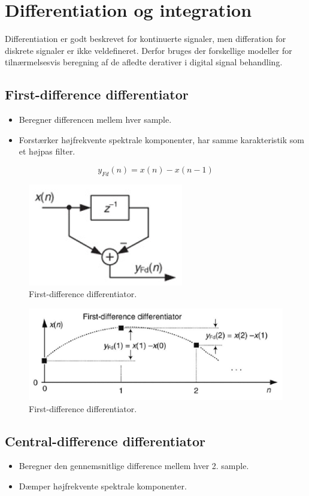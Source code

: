 \documentclass[danish]{article}
\begin{document}
\newpage
\section{Differentiation og integration}

Differentiation er godt beskrevet for kontinuerte signaler, men differation for diskrete signaler er ikke veldefineret. Derfor bruges der forskellige modeller for tilnærmelsesvis beregning af de afledte derativer i digital signal behandling.

\subsection{First-difference differentiator}
\begin{itemize}
	\item Beregner differencen mellem hver sample. 
	\item Forstærker højfrekvente spektrale komponenter, har samme karakteristik som et højpas filter.
\end{itemize}

\begin{equation}
y_{Fd}(n) = x(n)-x(n-1) 
\end{equation}

\begin{figure}[H]
	\centering
	\includegraphics[width=0.3\linewidth]{graphics/first-difference-differentiator}
	\caption{First-difference differentiator.}
	\label{fig:first-difference-differentiator}
\end{figure}

\begin{figure}[H]
	\centering
	\includegraphics[width=0.6\linewidth]{graphics/first-difference-differentiator1}
	\caption{First-difference differentiator.}
	\label{fig:first-difference-differentiator1}
\end{figure}

\subsection{Central-difference differentiator}
\begin{itemize}
	\item Beregner den gennemsnitlige difference mellem hver 2. sample.
	\item Dæmper højfrekvente spektrale komponenter.
\end{itemize}
\end{document}
